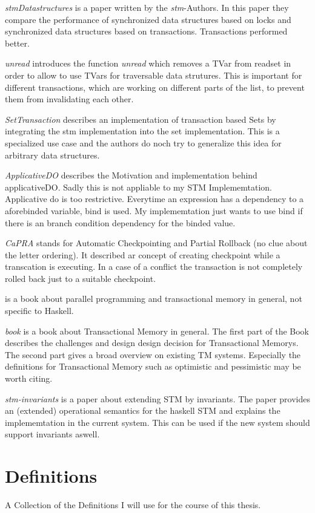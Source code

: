 \documentclass[a4paper,10pt]{article}
\begin{document}
\textit{stmDatastructures} is a paper written by the \textit{stm}-Authors. In this paper they compare the
performance of synchronized data structures based on locks and synchronized data structures based on transactions.
Transactions performed better.

\textit{unread} introduces the function \textit{unread} which removes a TVar from readset in order to allow to 
use TVars for traversable data strutures. This is important for different transactions, which are working on
different parts of the list, to prevent them from invalidating each other.

\textit{SetTransaction} describes an implementation of transaction based Sets by integrating the stm implementation
into the set implementation. This is a specialized use case and the authors do noch try to generalize this idea for
arbitrary data structures.

\textit{ApplicativeDO} describes the Motivation and implementation behind applicativeDO. Sadly this is not appliable
to my STM Implememtation. Applicative do is too restrictive. Everytime an expression has a dependency to a aforebinded
variable, bind is used. My implememtation just wants to use bind if there is an branch condition dependency for 
the binded value.

\textit{CaPRA} stands for Automatic Checkpointing and Partial Rollback (no clue about the letter ordering). It described 
ar concept of creating checkpoint while a transcation is executing. In a case of a conflict the transaction is not 
completely rolled back just to a suitable checkpoint.

\cite{larus2007transactional} is a book about parallel programming and transactional memory in general, not specific to
Haskell.

\textit{book} is a book about Transactional Memory in general. The first part of the Book describes the challenges and
design design decision for Transactional Memorys. The second part gives a broad overview on existing TM systems.
Especially the definitions for Transactional Memory such as optimistic and pessimistic may be worth citing.

\textit{stm-invariants} is a paper about extending STM by invariants. The paper provides an (extended) operational 
semantics for the haskell STM and explains the implememtation in the current system. This can be used if the 
new system should support invariants aswell.

\section{Definitions}
A Collection of the Definitions I will use for the course of this thesis.
\end{document}
